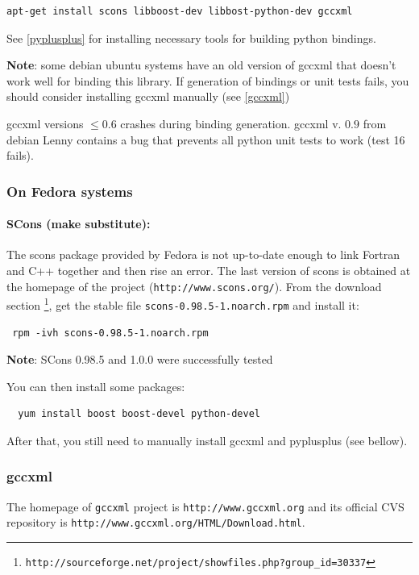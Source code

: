 \documentclass[12pt,a4paper]{article}
\begin{document}
\begin{verbatim}
apt-get install scons libboost-dev libbost-python-dev gccxml
\end{verbatim}
%
See \ref{pyplusplus} for installing necessary tools for building python bindings.


\textbf{Note}: some debian ubuntu systems have an old version of gccxml that doesn't work well for binding this
library. If generation of bindings or unit tests fails, you should consider installing gccxml manually (see \ref{gccxml})

gccxml versions $\le 0.6$ crashes during binding generation. gccxml v. $0.9$ from debian Lenny contains a bug that prevents all python unit tests to work (test 16 fails).


\subsubsection{On Fedora systems}

\paragraph{SCons (make substitute):}
The scons package provided by Fedora is not up-to-date enough to link Fortran and C++ together and then rise an
error. The last version of scons is obtained at the homepage of the project ({\tt  http://www.scons.org/}).
From the download section \footnote{\tt http://sourceforge.net/project/showfiles.php?group\_id=30337}, 
get the stable file {\tt scons-0.98.5-1.noarch.rpm} and install it:

\begin{verbatim}
 rpm -ivh scons-0.98.5-1.noarch.rpm
\end{verbatim}

\textbf{Note}: SCons 0.98.5 and 1.0.0 were successfully tested


You can then install some packages:

\begin{verbatim}
  yum install boost boost-devel python-devel
\end{verbatim}


After that, you still need to manually install gccxml and pyplusplus (see bellow).


\subsubsection{gccxml\label{gccxml}}

The homepage of {\tt gccxml} project is {\tt http://www.gccxml.org} and its official 
CVS repository is {\tt http://www.gccxml.org/HTML/Download.html}.
\end{document}
